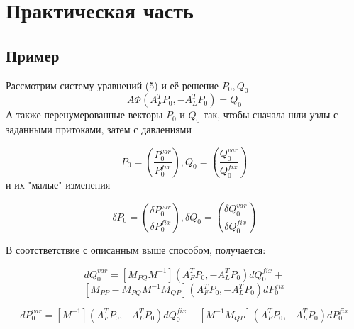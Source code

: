 \chapter{Практическая часть}
\section{Пример}
Рассмотрим систему уравнений (5) и её решение $ P_0, Q_0 $
$$ A \Phi(A_F^T P_0, -A_L^T P_0) = Q_0 $$
А также перенумерованные векторы $ P_0 $ и $ Q_0 $ так, чтобы сначала шли узлы с заданными притоками, затем с давлениями

$$ P_0 = \left(\frac{P_0^{var}}{P_0^{fix}}\right), Q_0 = \left(\frac{Q_0^{var}}{Q_0^{fix}}\right) $$
и их "малые" изменения

$$ \delta P_0 = \left(\frac{ \delta P_0^{var}}{ \delta P_0^{fix}}\right), \delta Q_0 = \left(\frac{ \delta Q_0^{var}}{ \delta  Q_0^{fix}}\right) $$

В соотстветствие с описанным выше способом, получается:

$$ dQ_0^{var} = [ M_{PQ} M^{-1} ] ( A_F^T P_0, -A_L^T P_0  ) dQ_0^{fix} + $$ $$ [ M_{PP} - M_{PQ} M^{-1} M_{QP} ] ( A_F^T P_0, -A_L^T P_0 ) dP_0^{fix} $$

$$ dP_0^{var} = [M^{-1}](A_F^T P_0, -A_L^T P_0) dQ_0^{fix} - [M^{-1} M_{QP}](A_F^T P_0, -A_L^T P_0) dP_0^{fix} $$